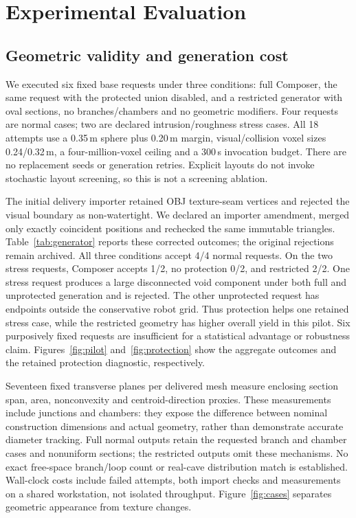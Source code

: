 \section{Experimental Evaluation}
\subsection{Geometric validity and generation cost}
We executed six fixed base requests under three conditions: full Composer,
the same request with the protected union disabled, and a restricted generator
with oval sections, no branches/chambers and no geometric modifiers. Four
requests are normal cases; two are declared intrusion/roughness stress cases.
All 18 attempts use a 0.35\,m sphere plus 0.20\,m margin, visual/collision
voxel sizes 0.24/0.32\,m, a four-million-voxel ceiling and a 300\,s invocation
budget. There are no replacement seeds or generation retries. Explicit layouts
do not invoke stochastic layout screening, so this is not a screening ablation.

The initial delivery importer retained OBJ texture-seam vertices and rejected
the visual boundary as non-watertight. We declared an importer amendment,
merged only exactly coincident positions and rechecked the same immutable
triangles. Table~\ref{tab:generator} reports these corrected outcomes; the
original rejections remain archived. All three conditions accept 4/4 normal
requests. On the two stress requests, Composer accepts 1/2, no protection 0/2,
and restricted 2/2. One stress request produces a large disconnected void
component under both full and unprotected generation and is rejected. The
other unprotected request has endpoints outside the conservative robot grid.
Thus protection helps one retained stress case, while the restricted geometry
has higher overall yield in this pilot. Six purposively fixed requests are
insufficient for a statistical advantage or robustness claim.
Figures~\ref{fig:pilot} and~\ref{fig:protection} show the aggregate outcomes
and the retained protection diagnostic, respectively.

Seventeen fixed transverse planes per delivered mesh measure enclosing
section span, area, nonconvexity and centroid-direction proxies. These
measurements include junctions and chambers: they expose the difference between
nominal construction dimensions and actual geometry, rather than demonstrate
accurate diameter tracking. Full normal outputs retain the requested branch
and chamber cases and nonuniform sections; the restricted outputs omit these
mechanisms. No exact free-space branch/loop count or real-cave distribution
match is established. Wall-clock costs include failed attempts, both import
checks and measurements on a shared workstation, not isolated throughput.
Figure~\ref{fig:cases} separates geometric appearance from texture changes.

